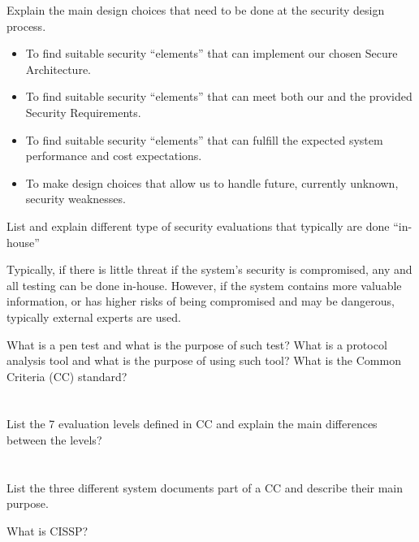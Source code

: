 \begin{questions}
\question{} Explain the main design choices that need to be done at the security design process.
  \begin{solution}
    \begin{itemize}[noitemsep]
    \item To find suitable security ``elements'' that can implement our chosen Secure Architecture.
    \item To find suitable security ``elements'' that can meet both our and the provided Security Requirements.
    \item To find suitable security ``elements'' that can fulfill the expected system performance and cost expectations.
    \item To make design choices that allow us to handle future, currently unknown, security weaknesses.
    \end{itemize}
  \end{solution}

\question{} List and explain different type of security evaluations that typically are done ``in-house''
  \begin{solution}
    Typically, if there is little threat if the system's security is compromised, any and all testing can be done in-house.
    However, if the system contains more valuable information, or has higher risks of being compromised and may be dangerous, typically external experts are used.
  \end{solution}

\question{} What is a pen test and what is the purpose of such test?
\question{} What is a protocol analysis tool and what is the purpose of using such tool?
\question{} What is the Common Criteria (CC) standard?
  \begin{parts}
  \part{} List the 7 evaluation levels defined in CC and explain the main differences between the levels?
  \part{} List the three different system documents part of a CC and describe their main purpose.
  \end{parts}

\question{} What is CISSP?\@
\end{questions}

